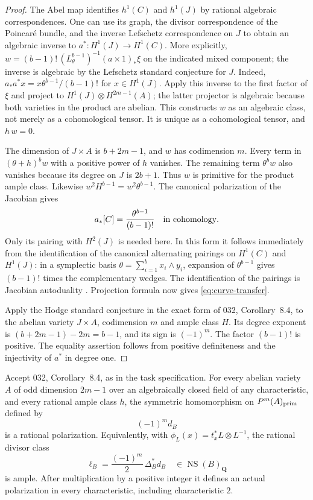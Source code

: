 \begin{proof}
The Abel map identifies $h^1(C)$ and $h^1(J)$ by rational algebraic
correspondences. One can use its graph, the divisor correspondence of
the Poincar\'e bundle, and the inverse Lefschetz correspondence on $J$
to obtain an algebraic inverse to $a^*:H^1(J)\to H^1(C)$.
More explicitly, $w=(b-1)!\,(L_\theta^{b-1})^{-1}(a\times1)_*\xi$ on the indicated mixed component; the inverse is algebraic by the Lefschetz standard conjecture for $J$. Indeed, $a_*a^*x=x\theta^{b-1}/(b-1)!$ for $x\in H^1(J)$. Apply this inverse to the first factor of $\xi$ and project to
$H^1(J)\otimes H^{2m-1}(A)$; the latter projector is algebraic because
both varieties in the product are abelian. This constructs $w$ as an
algebraic class, not merely as a cohomological tensor. It is unique as a
cohomological tensor, and $h\,w=0$.

The dimension of $J\times A$ is $b+2m-1$, and $w$ has codimension $m$.
Every term in $(\theta+h)^bw$ with a positive power of $h$ vanishes.
The remaining term $\theta^bw$ also vanishes because its degree on $J$
is $2b+1$. Thus $w$ is primitive for the product ample class.
Likewise $w^2H^{b-1}=w^2\theta^{b-1}$.
The canonical polarization of the Jacobian gives
\[
 a_*[C]=\frac{\theta^{b-1}}{(b-1)!}
 \quad\hbox{in cohomology}.
\]
Only its pairing with $H^2(J)$ is needed here. In this form it follows
immediately from the identification of the canonical alternating
pairings on $H^1(C)$ and $H^1(J)$: in a symplectic basis
$\theta=\sum_{i=1}^b x_i\wedge y_i$, expansion of
$\theta^{b-1}$ gives $(b-1)!$ times the complementary wedges.
The identification of the pairings is Jacobian autoduality
\cite[Chapter~III, Theorem~6.8 and Summary~6.11]{MilneAV}.
Projection formula now gives \eqref{eq:curve-transfer}.

Apply the Hodge standard conjecture in the exact form of 032,
Corollary~8.4, to the abelian variety $J\times A$, codimension $m$ and
ample class $H$. Its degree exponent is
$(b+2m-1)-2m=b-1$, and its sign is $(-1)^m$.
The factor $(b-1)!$ is positive. The equality assertion follows from
positive definiteness and the injectivity of $a^*$ in degree one.
\end{proof}

\begin{theorem}
\label{thm:T4}
Accept 032, Corollary~8.4, as in the task specification. For every
abelian variety $A$ of odd dimension $2m-1$ over an algebraically closed
field of any characteristic, and every rational ample class $h$, the
symmetric homomorphism on $P^m(A)_{\rm prim}$ defined by
\[
 (-1)^m d_B
\]
is a rational polarization. Equivalently, with
$\phi_L(x)=t_x^*L\otimes L^{-1}$, the rational divisor class
\begin{equation}\label{eq:T4-divisor}
 \ell_B=\frac{(-1)^m}{2}\,\Delta_B^*d_B
 \quad\in\operatorname{NS}(B)_{\mathbf Q}
\end{equation}
is ample. After multiplication by a positive integer it defines an
actual polarization in every characteristic, including characteristic
$2$.
\end{theorem}

